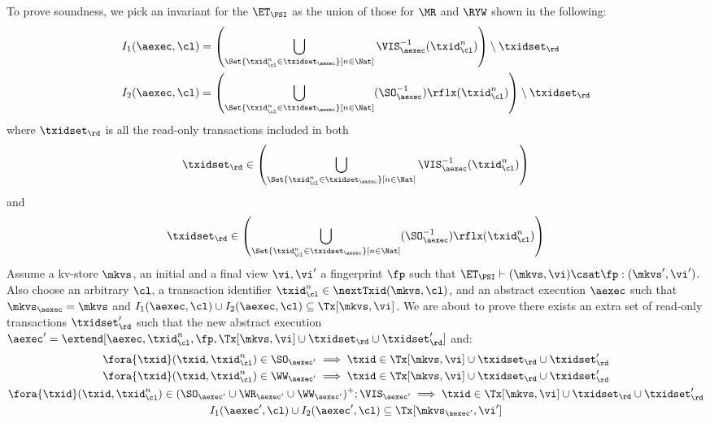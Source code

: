 To prove soundness, we pick an invariant for the \( \ET_\PSI \) as the union of those for \( \MR\) and \( \RYW \) shown in the following:
\begin{align*}
    I_1(\aexec, \cl) & =  \left( \bigcup_{\Set{\txid_{\cl}^{n} \in \txidset_{\aexec} }[ n \in \Nat ]} \VIS_{\aexec}^{-1}(\txid^n_\cl) \right) \setminus \txidset_\rd \\
    I_2(\aexec, \cl) & =  \left( \bigcup_{\Set{\txid_{\cl}^{n} \in \txidset_{\aexec} }[ n \in \Nat ]} (\SO_{\aexec}^{-1})\rflx(\txid^n_\cl) \right) \setminus \txidset_\rd
\end{align*}
where \( \txidset_\rd \) is all the read-only transactions included in both 
\[ \txidset_\rd \in \left( \bigcup_{\Set{\txid_{\cl}^{n} \in \txidset_{\aexec} }[ n \in \Nat ]} \VIS_{\aexec}^{-1}(\txid^n_\cl) \right)\]
and \[ \txidset_\rd  \in \left( \bigcup_{\Set{\txid_{\cl}^{n} \in \txidset_{\aexec} }[ n \in \Nat ]} (\SO_{\aexec}^{-1})\rflx(\txid^n_\cl) \right) \]
Assume a kv-store $\mkvs$, an initial and a final view $\vi, \vi'$  a fingerprint $\fp$ 
such that $\ET_{\PSI} \vdash (\mkvs, \vi) \csat \fp: (\mkvs',\vi')$. 
Also choose an arbitrary $\cl$, a transaction identifier $\txid_\cl^n \in \nextTxid(\mkvs, \cl)$, 
and an abstract execution $\aexec$ such that $\mkvs_{\aexec} = \mkvs$ and 
\( I_1(\aexec, \cl) \cup I_2(\aexec, \cl) \subseteq \Tx[\mkvs, \vi] \).
We are about to prove there exists an extra set of read-only transactions \( \txidset'_\rd \) such that
the new abstract execution \( \aexec' = \extend[\aexec, \txid_\cl^n, \fp, \Tx[\mkvs, \vi] \cup \txidset_\rd \cup \txidset'_\rd] \) and:
\begin{gather}
    \fora{\txid} (\txid, \txid_\cl^n) \in \SO_{\aexec'} \implies \txid \in \Tx[\mkvs, \vi] \cup \txidset_\rd \cup \txidset'_\rd \label{equ:psi-sound-update-so}\\
    \fora{\txid} (\txid, \txid_\cl^n) \in \WW_{\aexec'} \implies \txid \in \Tx[\mkvs, \vi] \cup \txidset_\rd \cup \txidset'_\rd \label{equ:psi-sound-update-ua}\\
    \fora{\txid} (\txid, \txid_\cl^n) \in ( \SO_{\aexec'} \cup \WR_{\aexec'} \cup \WW_{\aexec'} )^{+} ; \VIS_{\aexec'} \implies \txid \in \Tx[\mkvs, \vi] \cup \txidset_\rd \cup \txidset'_\rd \label{equ:psi-sound-update-closure}\\
    I_1(\aexec',\cl) \cup I_2(\aexec',\cl) \subseteq \Tx[\mkvs_{\aexec'}, \vi'] \label{equ:psi-sound-inv} 
\end{gather}
